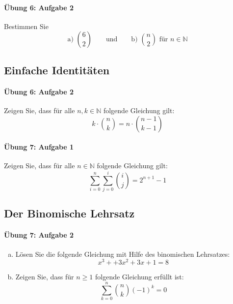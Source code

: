 \documentclass
[
  draft    = true,
  fontsize = 11pt,
  parskip  = half-,
  BCOR     = 0pt,
  DIV      = 11,
  ngerman,
  dvipsnames
]
{scrartcl}
\begin{document}
\paragraph{Übung 6: Aufgabe 2}
Bestimmen Sie
\begin{equation*}
  \text{a) }\binom{6}{2}
  \qquad
  \text{und}
  \qquad
  \text{b) }\binom{n}{2}\text{ für }n\in\mathbb{N}
\end{equation*}

\subsection{Einfache Identitäten}

\paragraph{Übung 6: Aufgabe 2}
Zeigen Sie, dass für alle $n,k\in\mathbb{N}$ folgende Gleichung gilt:
\begin{equation*}
  k\cdot\binom{n}{k}=n\cdot\binom{n-1}{k-1}
\end{equation*}

\paragraph{Übung 7: Aufgabe 1}
Zeigen Sie, dass für alle $n\in\mathbb{N}$ folgende Gleichung gilt:
\begin{equation*}
  \sum_{i=0}^{n}\sum_{j=0}^{i}\binom{i}{j}=2^{n+1}-1
\end{equation*}

\subsection{Der Binomische Lehrsatz}

\paragraph{Übung 7: Aufgabe 2}
\begin{enumerate}[a)]
  \item Lösen Sie die folgende Gleichung mit Hilfe des binomischen Lehrsatzes:
        \begin{equation*}
          x^3++3x^2+3x+1=8
        \end{equation*}
  \item Zeigen Sie, dass für $n\geq1$ folgende Gleichung erfüllt ist:
        \begin{equation*}
          \sum_{k=0}^{n}\binom{n}{k}(-1)^k=0
        \end{equation*}
\end{enumerate}
\end{document}
